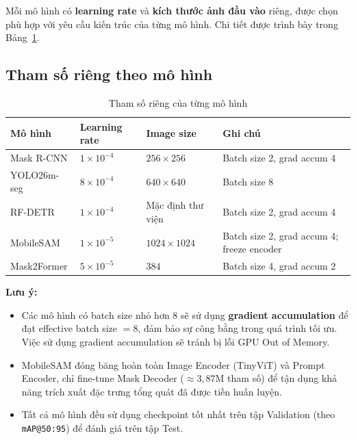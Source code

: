 Mỗi mô hình có \textbf{learning rate} và \textbf{kích thước ảnh đầu vào} riêng, được chọn phù hợp với yêu cầu kiến trúc của từng mô hình. Chi tiết được trình bày trong Bảng~\ref{tab:model_specific_config}.

\subsection{Tham số riêng theo mô hình}

\begin{table}[H]
    \caption{Tham số riêng của từng mô hình}
    \centering
    \begin{tabular}{llll}
        \toprule
        \textbf{Mô hình} & \textbf{Learning rate} & \textbf{Image size} & \textbf{Ghi chú}                           \\
        \midrule
        Mask R-CNN       & $1 \times 10^{-4}$     & $256 \times 256$    & Batch size 2, grad accum 4                 \\
        YOLO26m-seg      & $8 \times 10^{-4}$     & $640 \times 640$    & Batch size 8                               \\
        RF-DETR          & $1 \times 10^{-4}$     & Mặc định thư viện   & Batch size 2, grad accum 4                 \\
        MobileSAM        & $1 \times 10^{-5}$     & $1024 \times 1024$  & Batch size 2, grad accum 4; freeze encoder \\
        Mask2Former      & $5 \times 10^{-5}$     & $384$               & Batch size 4, grad accum 2                 \\
        \bottomrule
    \end{tabular}
    \label{tab:model_specific_config}
\end{table}

\textbf{Lưu ý:}
\begin{itemize}
    \item Các mô hình có batch size nhỏ hơn 8 sẽ sử dụng \textbf{gradient accumulation} để đạt effective batch size $= 8$, đảm bảo sự công bằng trong quá trình tối ưu. Việc sử dụng gradient accumulation sẽ tránh bị lỗi GPU Out of Memory.
    \item MobileSAM đóng băng hoàn toàn Image Encoder (TinyViT) và Prompt Encoder, chỉ fine-tune Mask Decoder ($\approx 3,87$M tham số) để tận dụng khả năng trích xuất đặc trưng tổng quát đã được tiền huấn luyện.
    \item Tất cả mô hình đều sử dụng checkpoint tốt nhất trên tập Validation (theo \texttt{mAP@50:95}) để đánh giá trên tập Test.
\end{itemize}
